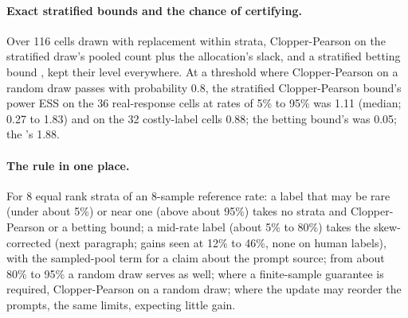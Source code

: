\paragraph{Exact stratified bounds and the chance of certifying.} Over 116 cells drawn with replacement within strata,
Clopper-Pearson on the stratified draw's pooled count plus the allocation's slack, and a stratified betting bound
\citep{spertus2022sweeter}, kept their level everywhere. At a threshold where Clopper-Pearson on a random draw passes with
probability 0.8, the stratified Clopper-Pearson bound's power ESS on the 36 real-response cells at rates of 5\% to 95\%
was 1.11 (median; 0.27 to 1.83) and on the 32 costly-label cells 0.88; the betting bound's was 0.05; the \SWT{}'s 1.88.

\paragraph{The rule in one place.} For 8 equal rank strata of an 8-sample reference rate: a label that may be rare (under
about 5\%) or near one (above about 95\%) takes no strata and Clopper-Pearson or a betting bound; a mid-rate label (about 5\%
to 80\%) takes the skew-corrected \SWT{} (next paragraph; gains seen at 12\% to 46\%, none on human labels), with the sampled-pool term for a claim about the prompt source; from about 80\% to 95\% a random
draw serves as well; where a finite-sample guarantee is required, Clopper-Pearson on a random draw; where the update may
reorder the prompts, the same limits, expecting little gain.

